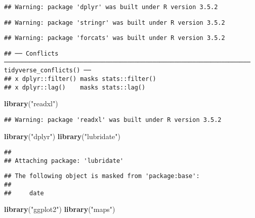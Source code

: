 \documentclass[]{article}
\newenvironment{Shaded}{\begin{snugshade}}{\end{snugshade}}
\newcommand{\KeywordTok}[1]{\textcolor[rgb]{0.13,0.29,0.53}{\textbf{#1}}}
\newcommand{\NormalTok}[1]{#1}
\newcommand{\StringTok}[1]{\textcolor[rgb]{0.31,0.60,0.02}{#1}}
\begin{document}
\begin{verbatim}
## Warning: package 'dplyr' was built under R version 3.5.2
\end{verbatim}

\begin{verbatim}
## Warning: package 'stringr' was built under R version 3.5.2
\end{verbatim}

\begin{verbatim}
## Warning: package 'forcats' was built under R version 3.5.2
\end{verbatim}

\begin{verbatim}
## ── Conflicts ──────────────────────────────────────────────────────────────────── tidyverse_conflicts() ──
## x dplyr::filter() masks stats::filter()
## x dplyr::lag()    masks stats::lag()
\end{verbatim}

\begin{Shaded}
\begin{Highlighting}[]
\KeywordTok{library}\NormalTok{(}\StringTok{"readxl"}\NormalTok{)}
\end{Highlighting}
\end{Shaded}

\begin{verbatim}
## Warning: package 'readxl' was built under R version 3.5.2
\end{verbatim}

\begin{Shaded}
\begin{Highlighting}[]
\KeywordTok{library}\NormalTok{(}\StringTok{"dplyr"}\NormalTok{)}
\KeywordTok{library}\NormalTok{(}\StringTok{"lubridate"}\NormalTok{)}
\end{Highlighting}
\end{Shaded}

\begin{verbatim}
## 
## Attaching package: 'lubridate'
\end{verbatim}

\begin{verbatim}
## The following object is masked from 'package:base':
## 
##     date
\end{verbatim}

\begin{Shaded}
\begin{Highlighting}[]
\KeywordTok{library}\NormalTok{(}\StringTok{"ggplot2"}\NormalTok{)}
\KeywordTok{library}\NormalTok{(}\StringTok{"maps"}\NormalTok{)}
\end{Highlighting}
\end{Shaded}
\end{document}
